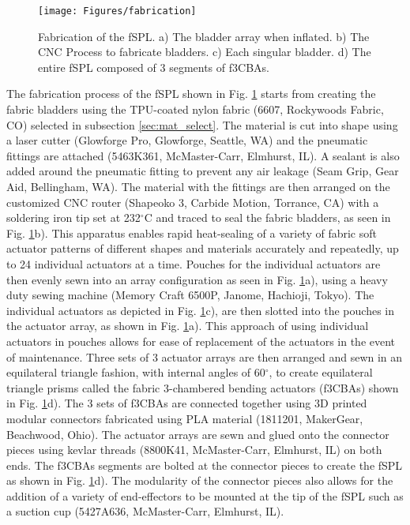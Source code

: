 \documentclass[letterpaper, 10 pt, conference]{ieeeconf}  %
\begin{document}
\begin{figure}[t!]
\centering
\texttt{[image: Figures/fabrication]}
\caption{Fabrication of the fSPL. a) The bladder array when inflated. b) The CNC Process to fabricate bladders. c) Each singular bladder. d) The entire fSPL composed of 3 segments of f3CBAs.}
\label{fig:fabrication}
\vspace{-1.5em}
\end{figure}

The fabrication process of the fSPL shown in Fig. \ref{fig:fabrication} starts from creating the fabric bladders using the TPU-coated nylon fabric (6607, Rockywoods Fabric, CO) selected in subsection \ref{sec:mat_select}.  The material is cut into shape using a laser cutter (Glowforge Pro, Glowforge, Seattle, WA) and the pneumatic fittings are attached (5463K361, McMaster-Carr, Elmhurst, IL). A sealant is also added around the pneumatic fitting to prevent any air leakage (Seam Grip, Gear Aid, Bellingham, WA). The material with the fittings are then arranged on the customized CNC router (Shapeoko 3, Carbide Motion, Torrance, CA) with a soldering iron tip set at 232$^{\circ}$C and traced to seal the fabric bladders, as seen in Fig. \ref{fig:fabrication}b). This apparatus enables rapid heat-sealing of a variety of fabric soft actuator patterns of different shapes and materials accurately and repeatedly, up to 24 individual actuators at a time. Pouches for the individual actuators are then evenly sewn into an array configuration as seen in Fig. \ref{fig:fabrication}a), using a heavy duty sewing machine (Memory Craft 6500P, Janome, Hachioji, Tokyo). The individual actuators as depicted in Fig. \ref{fig:fabrication}c), are then slotted into the pouches in the actuator array, as shown in Fig. \ref{fig:fabrication}a). This approach of using individual actuators in pouches allows for ease of replacement of the actuators in the event of maintenance. Three sets of 3 actuator arrays are then arranged and sewn in an equilateral triangle fashion, with internal angles of 60$^{\circ}$, to create equilateral triangle prisms called the fabric 3-chambered bending actuators (f3CBAs) shown in Fig. \ref{fig:fabrication}d). The 3 sets of f3CBAs are connected together using 3D printed modular connectors fabricated using PLA material (1811201, MakerGear, Beachwood, Ohio). The actuator arrays are sewn and glued onto the connector pieces using kevlar threads (8800K41, McMaster-Carr, Elmhurst, IL) on both ends. The f3CBAs segments are bolted at the connector pieces to create the fSPL as shown in Fig. \ref{fig:fabrication}d). The modularity of the connector pieces also allows for the addition of a variety of end-effectors to be mounted at the tip of the fSPL such as a suction cup (5427A636, McMaster-Carr, Elmhurst, IL).
\end{document}
